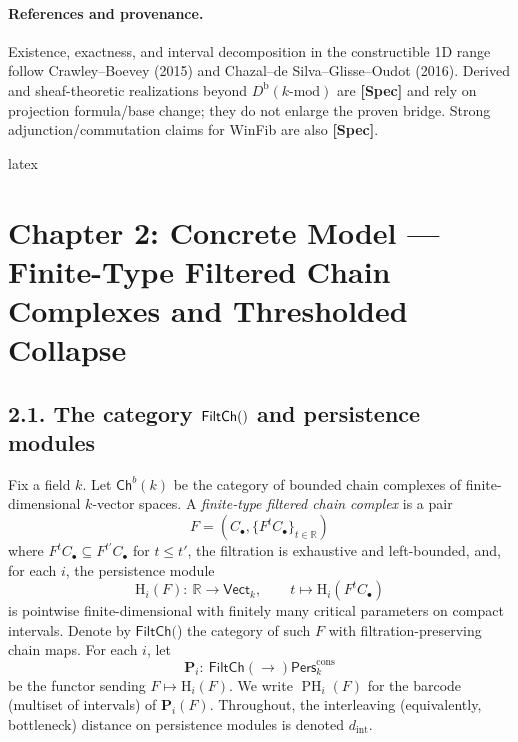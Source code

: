 \documentclass[11pt]{article}
\numberwithin{equation}{section}
\theoremstyle{plain}
\theoremstyle{definition}
\theoremstyle{remark}
\DeclareMathOperator{\PH}{PH}
\newcommand{\Pers}{\mathsf{Pers}}
\theoremstyle{plain}
\theoremstyle{definition}
\numberwithin{equation}{section}
\theoremstyle{definition}
\DeclareRobustCommand{\FiltCh}[1]{\mathsf{FiltCh}(#1)}
\numberwithin{equation}{section}
\theoremstyle{plain}
\theoremstyle{definition}
\theoremstyle{remark}
\newcommand{\bbR}{\mathbb{R}}
\newcommand{\Vectk}{\mathsf{Vect}_k}
\newcommand{\Dbk}{D^{\mathrm{b}}(k\text{-mod})}
\newcommand{\Perscons}{\Pers^{\mathrm{cons}}_k}
\newcommand{\intdist}{d_{\mathrm{int}}}
\providecommand{\intdist}{d_{\mathrm{int}}}  %
\begin{document}
\paragraph{References and provenance.}
Existence, exactness, and interval decomposition in the constructible 1D range follow Crawley--Boevey (2015) and Chazal--de Silva--Glisse--Oudot (2016). Derived and sheaf-theoretic realizations beyond \(\Dbk\) are \textbf{[Spec]} and rely on projection formula/base change; they do not enlarge the proven bridge. Strong adjunction/commutation claims for WinFib are also \textbf{[Spec]}.



latex
\section{Chapter 2: Concrete Model — Finite-Type Filtered Chain Complexes and Thresholded Collapse}

\subsection*{2.1. The category \texorpdfstring{$\FiltCh$}{FiltCh(k)} and persistence modules}
Fix a field \(k\). Let \(\mathsf{Ch}^{b}(k)\) be the category of bounded chain complexes of finite-dimensional \(k\)-vector spaces. A \emph{finite-type filtered chain complex} is a pair
\[
F=(C_\bullet,\{F^{t}C_\bullet\}_{t\in\bbR})
\]
where \(F^{t}C_\bullet\subseteq F^{t'}C_\bullet\) for \(t\le t'\), the filtration is exhaustive and left-bounded, and, for each \(i\), the persistence module
\[
\mathrm{H}_i(F):\ \bbR\longrightarrow \Vectk,\qquad t\longmapsto \mathrm{H}_i(F^{t}C_\bullet)
\]
is pointwise finite-dimensional with finitely many critical parameters on compact intervals. Denote by \(\FiltCh\) the category of such \(F\) with filtration-preserving chain maps. For each \(i\), let
\[
\mathbf{P}_i:\ \FiltCh\longrightarrow \Perscons
\]
be the functor sending \(F\mapsto \mathrm{H}_i(F)\). We write \(\PH_i(F)\) for the barcode (multiset of intervals) of \(\mathbf{P}_i(F)\). Throughout, the interleaving (equivalently, bottleneck) distance on persistence modules is denoted \(\intdist\).
\end{document}

